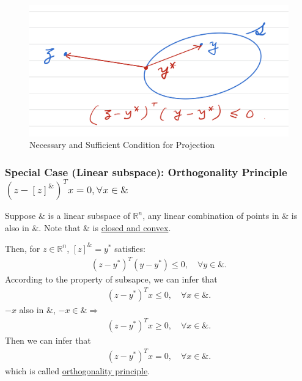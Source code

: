 \documentclass[11pt,a4paper]{article}
\begin{document}
\begin{center}\begin{figure}[htbp]
    \centering
    \includegraphics[scale=0.3]{projection3.png}
    \caption{Necessary and Sufficient Condition for Projection}
    \label{}
\end{figure}\end{center}

\subsubsection{Special Case (Linear subspace): Orthogonality Principle $(z-[z]^\&)^Tx= 0,\forall x\in\&$}
Suppose $\&$ is a linear subspace of $\mathbb{R}^n$, any linear combination of points in $\&$ is also in $\&$. Note that $\&$ is \underline{closed and convex}.

Then, for $z\in \mathbb{R}^n$, $[z]^\&=y^*$ satisfies:
\begin{equation}
    \begin{aligned}
        (z-y^*)^T(y-y^*)\leq 0,\quad \forall y\in\&.
    \end{aligned}
    \nonumber
\end{equation}
According to the property of subsapce, we can infer that
\begin{equation}
    \begin{aligned}
        (z-y^*)^Tx\leq 0,\quad \forall x\in\&.
    \end{aligned}
    \nonumber
\end{equation}
$-x$ also in $\&$, $-x\in\& \Rightarrow$
\begin{equation}
    \begin{aligned}
        (z-y^*)^Tx\geq 0,\quad \forall x\in\&.
    \end{aligned}
    \nonumber
\end{equation}
Then we can infer that
\begin{equation}
    \begin{aligned}
        (z-y^*)^Tx= 0,\quad \forall x\in\&.
    \end{aligned}
    \nonumber
\end{equation}
which is called \underline{orthogonality principle}.
\end{document}
